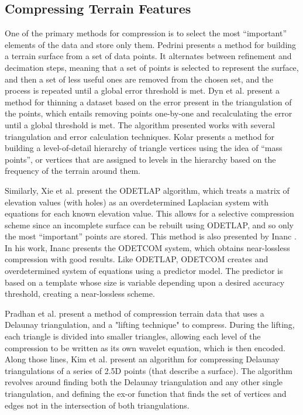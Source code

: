 \subsection{Compressing Terrain Features}

One of the primary methods for compression is to select the most ``important'' elements of the data and store only them. Pedrini \cite{conf/wscg/Pedrini01} presents a method for building a terrain surface from a set of data points. It alternates between refinement and decimation steps, meaning that a set of points is selected to represent the surface, and then a set of less useful ones are removed from the chosen set, and the process is repeated until a global error threshold is met. Dyn et al. \cite{Dyn02adaptivethinning} present a method for thinning a dataset based on the error present in the triangulation of the points, which entails removing points one-by-one and recalculating the error until a global threshold is met. The algorithm presented works with several triangulation and error calculation techniques. Kolar \cite{1e218e70004511dab4d5000ea68e967b} presents a method for building a level-of-detail hierarchy of triangle vertices using the idea of ``mass points'', or vertices that are assigned to levels in the hierarchy based on the frequency of the terrain around them. 

Similarly, Xie et al. \cite{Xie_approximatingterrain} present the ODETLAP algorithm, which treats a matrix of elevation values (with holes) as an overdetermined Laplacian system with equations for each known elevation value. This allows for a selective compression scheme since an incomplete surface can be rebuilt using ODETLAP, and so only the most ``important'' points are stored. 
This method is also presented by Inanc \cite{inanc-phd}. In his work, Inanc presents the ODETCOM system, which obtains near-lossless 
compression with good results. Like ODETLAP, ODETCOM creates and overdetermined system of equations using a predictor model. The predictor is based on a template whose size is variable depending upon a desired accuracy threshold, creating a near-lossless scheme.

Pradhan et al. \cite{Pradhan_gisterrain} present a method of compression terrain data that uses a Delaunay triangulation, and a "lifting technique" to compress. During the lifting, each triangle is divided into smaller triangles, allowing each level of the compression to be written as its own wavelet equation, which is then encoded. Along those lines, Kim et al. \cite{Kim_ageometric} present an algorithm for compressing Delaunay triangulations of a series of 2.5D points (that describe a surface). The algorithm revolves around finding both the Delaunay triangulation and any other single triangulation, and defining the ex-or function that finds the set of vertices and edges not in the intersection of both triangulations.

